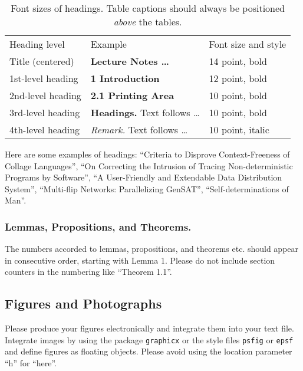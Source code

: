 \documentclass[runningheads]{llncs}
\begin{document}
	\setlength{\tabcolsep}{4pt}
	\begin{table}
		\centering
		\caption{Font sizes of headings. Table captions should always be positioned {\it above} the tables.}
		\label{table:headings}
		\begin{tabular}{lll}
			\hline\noalign{\smallskip}
			Heading level & Example & Font size and style\\
			\noalign{\smallskip}
			\hline
			\noalign{\smallskip}
			Title (centered)  & {\Large \bf Lecture Notes \dots}   & 14 point, bold\\
			1st-level heading & {\large \bf 1 Introduction}        & 12 point, bold\\
			2nd-level heading & {\bf 2.1 Printing Area}            & 10 point, bold\\
			3rd-level heading & {\bf Headings.} Text follows \dots & 10 point, bold\\
			4th-level heading & {\it Remark.} Text follows \dots   & 10 point, italic\\
			\hline
		\end{tabular}
	\end{table}
	\setlength{\tabcolsep}{1.4pt}

	Here are some examples of headings:
	``Criteria to Disprove Context-Freeness of Collage Languages'',
	``On Correcting the Intrusion of Tracing Non-deterministic Programs by Software'',
	``A User-Friendly and Extendable Data Distribution System'',
	``Multi-flip Networks: Parallelizing GenSAT'',
	``Self-determinations of Man''.

	\subsubsection{Lemmas, Propositions, and Theorems.}
	The numbers accorded to lemmas, propositions, and theorems etc. should appear in consecutive order, starting with Lemma 1.
	Please do not include section counters in the numbering like ``Theorem 1.1''.

	\subsection{Figures and Photographs}
	\label{sec:figures}
	Please produce your figures electronically and integrate them into your text file.
	Integrate images by using the package \verb+graphicx+ or the style files \verb+psfig+ or \verb+epsf+ and define figures as floating objects.
	Please avoid using the location parameter ``h'' for ``here''.
\end{document}
